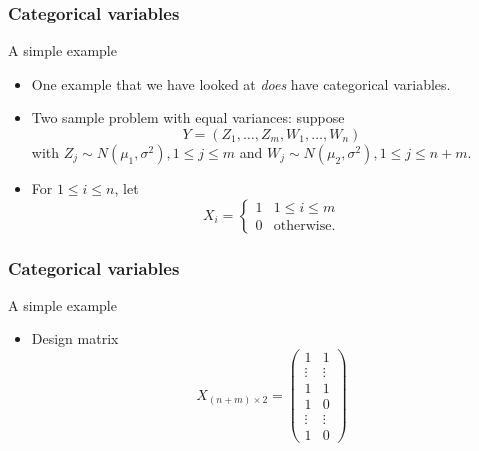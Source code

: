 \documentclass[handout]{beamer}
\begin{document}
   \begin{frame} \frametitle{Categorical variables}

   \begin{block}
   {A simple example}
   \begin{itemize}

   \item       One example that we have looked at
   {\em does} have categorical variables.

   \item Two sample problem with equal variances:
   suppose
   $$
   Y = (Z_1, \dots, Z_m, W_1, \dots, W_n)$$
   with $Z_j \sim N(\mu_1, \sigma^2), 1 \leq j \leq m$ and $W_j \sim N(\mu_2, \sigma^2), 1 \leq j \leq n + m$.

   \item For  $1 \leq i \leq n$, let
   $$
   X_i =
   \begin{cases}
   1 & 1 \leq i \leq m \\
   0 & \text{otherwise.}
   \end{cases}
   $$
   \end{itemize}
   \end{block}
   \end{frame}


   \begin{frame} \frametitle{Categorical variables}

   \begin{block}
   {A simple example}
   \begin{itemize}

   \item Design matrix
   $$
   X_{(n+m) \times 2} =
   \begin{pmatrix}
   1 & 1 \\
   \vdots & \vdots \\
   1 & 1 \\
   1 & 0 \\
   \vdots & \vdots \\
   1 & 0
   \end{pmatrix}
   $$
   \end{itemize}
   \end{block}
   \end{frame}

\end{document}
